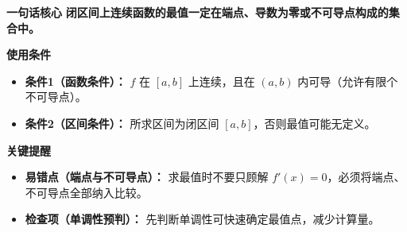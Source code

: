 \begin{summarybox}
	\textbf{\textcolor{CSummary}{一句话核心}}
	\textbf{闭区间上连续函数的最值一定在端点、导数为零或不可导点构成的集合中。}

	\medskip
	\textbf{\textcolor{CSummary}{使用条件}}
	\begin{itemize}[leftmargin=*, itemsep=0.5em, topsep=0.4em]
		\item \textbf{条件1（函数条件）：} $f$ 在 $[a,b]$ 上连续，且在 $(a,b)$ 内可导（允许有限个不可导点）。
		\item \textbf{条件2（区间条件）：} 所求区间为闭区间 $[a,b]$，否则最值可能无定义。
	\end{itemize}

	\medskip
	\textbf{\textcolor{CSummary}{关键提醒}}
	\begin{itemize}[leftmargin=*, itemsep=0.5em, topsep=0.4em]
		\item \textbf{易错点（端点与不可导点）：} 求最值时不要只顾解 $f'(x)=0$，必须将端点、不可导点全部纳入比较。
		\item \textbf{检查项（单调性预判）：} 先判断单调性可快速确定最值点，减少计算量。
	\end{itemize}

\end{summarybox}
